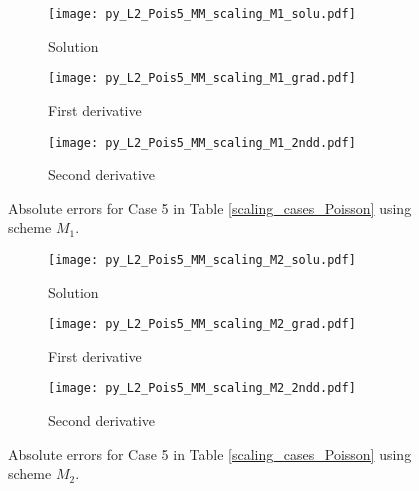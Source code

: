 \documentclass[review,3p]{elsarticle}
\begin{document}
\begin{figure}[!ht]
    \begin{subfigure}{5.5cm}
        \texttt{[image: py\_L2\_Pois5\_MM\_scaling\_M1\_solu.pdf]}
        \caption{Solution}
        \label{py_L2_Pois5_MM_scaling_M1_solu}
    \end{subfigure}
    \hspace{-0.2cm}
    \begin{subfigure}{5.5cm}
        \texttt{[image: py\_L2\_Pois5\_MM\_scaling\_M1\_grad.pdf]}
        \caption{First derivative}
        \label{py_L2_Pois5_MM_scaling_M1_grad}
    \end{subfigure}
    \hspace{-0.2cm}
    \begin{subfigure}{5.5cm}
        \texttt{[image: py\_L2\_Pois5\_MM\_scaling\_M1\_2ndd.pdf]}
        \caption{Second derivative}
        \label{py_L2_Pois5_MM_scaling_M1_2ndd}
    \end{subfigure}
\caption{Absolute errors for Case 5 in Table \ref{scaling_cases_Poisson} using scheme $M_1$.}
\label{py_L2_Pois5_MM_scaling_M1}
\end{figure}

\begin{figure}[!ht]
    \begin{subfigure}{5.5cm}
        \texttt{[image: py\_L2\_Pois5\_MM\_scaling\_M2\_solu.pdf]}
        \caption{Solution}
        \label{py_L2_Pois5_MM_scaling_M2_solu}
    \end{subfigure}
    \hspace{-0.2cm}
    \begin{subfigure}{5.5cm}
        \texttt{[image: py\_L2\_Pois5\_MM\_scaling\_M2\_grad.pdf]}
        \caption{First derivative}
        \label{py_L2_Pois5_MM_scaling_M2_grad}
    \end{subfigure}
    \hspace{-0.2cm}
    \begin{subfigure}{5.5cm}
        \texttt{[image: py\_L2\_Pois5\_MM\_scaling\_M2\_2ndd.pdf]}
        \caption{Second derivative}
        \label{py_L2_Pois5_MM_scaling_M2_2ndd}
    \end{subfigure}
\caption{Absolute errors for Case 5 in Table \ref{scaling_cases_Poisson} using scheme $M_2$.}
\label{py_L2_Pois5_MM_scaling_M2}
\end{figure}

\newpage

  
\end{document}
